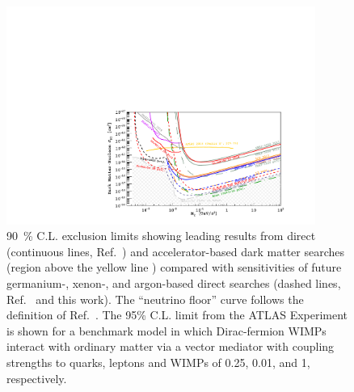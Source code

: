 \begin{figure}[!b]
\begin{center}
\includegraphics[width=0.9\textwidth]{./Figures/DSklSensitivitySimplified.pdf}
\caption[Current \DM\ limits and sensitivities for future experiments.]
{\SI{90}{\percent} C.L. exclusion limits showing leading results from direct (continuous lines, Ref.~\cite{Angloher:2012kl,Akerib:2017kg,Cui:2017kg,Aprile:2018ct,Agnes:2018ep,Agnes:2018fg}) and accelerator-based dark matter searches (region above the yellow line \cite{TheATLASCollaboration:2018to}) compared with sensitivities of future germanium-, xenon-, and argon-based direct searches (dashed lines, Ref.~\cite{Nelson:2014wy,Kudryavtsev:2015hy,Aprile:2015wv,Boulay:2017tn,Agnese:2017fn} and this work).  The ``neutrino floor'' curve follows the definition of Ref.~\cite{Billard:2014cx}. The 95\% C.L. limit from the ATLAS Experiment is shown for a benchmark model in which Dirac-fermion WIMPs interact with ordinary matter via a vector mediator\cite{Abercrombie:2015to} with coupling strengths to quarks, leptons and WIMPs of 0.25, 0.01, and 1, respectively.
}
\label{fig:DSklSensitivitySimplified}
\end{center}
\end{figure}

